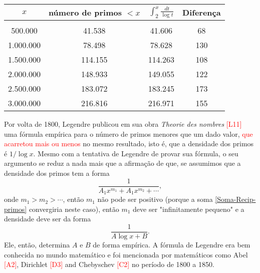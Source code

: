     \begin{table}[H]
        \centering
        \begin{tabular}{cccc}
             $x$& número de primos $< x$ & $\displaystyle \int_{2}^{x} \frac{dt}{\log t}$ &  Diferença\\[0.45cm]
             \hline\\[-0.3cm]
             500.000   & 41.538  & 41.606  & 68  \\[0.1cm]
             1.000.000 & 78.498  & 78.628  & 130 \\[0.1cm]
             1.500.000 & 114.155 & 114.263 & 108 \\[0.1cm]
             2.000.000 & 148.933 & 149.055 & 122 \\[0.1cm]
             2.500.000 & 183.072 & 183.245 & 173 \\[0.1cm]
             3.000.000 & 216.816 & 216.971 & 155
        \end{tabular}
        \caption{}
        \label{Tabela-Lehmer}
    \end{table}
    
    Por volta de 1800, Legendre publicou em sua obra \textit{Theorie des nombres} \textcolor{red}{[L11]} uma fórmula empírica para o número de primos menores que um dado valor, \textcolor{red}{que acarretou mais ou menos} no mesmo resultado, isto é, que a densidade dos primos é $1/\log x$. Mesmo com a tentativa de Legendre de provar sua fórmula, o seu argumento se reduz a nada mais que a afirmação de que, se assumimos que a densidade dos primos tem a forma
    $$\frac{1}{A_1x^{m_1} + A_1x^{m_2} + \cdots},$$
    onde $m_1 > m_2> \cdots$, então $m_1$ não pode ser positivo (porque a soma \eqref{Soma-Recip-primos} convergiria neste caso), então $m_1$ deve ser "infinitamente pequeno" e a densidade deve ser da forma
    $$\frac{1}{A \log x + B}.$$
    Ele, então, determina $A$ e $B$ de forma empírica. A fórmula de Legendre era bem conhecida no mundo matemático e foi mencionada por matemáticos como Abel \textcolor{red}{[A2]}, Dirichlet \textcolor{red}{[D3]} and Chebyschev \textcolor{red}{[C2]} no período de 1800 a 1850.
    
